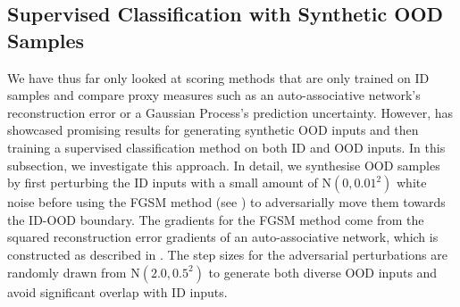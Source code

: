 \subsection{Supervised Classification with Synthetic OOD Samples} \label{txt:ood-scoring-classification}

We have thus far only looked at scoring methods that are only trained on ID samples and compare proxy measures such as an auto-associative network's reconstruction error or a Gaussian Process's prediction uncertainty. However,  has showcased promising results for generating synthetic OOD inputs and then training a supervised classification method on both ID and OOD inputs. In this subsection, we investigate this approach. In detail, we synthesise OOD samples by first perturbing the ID inputs with a small amount of $\text{N}(0, 0.01^2)$ white noise before using the FGSM method (see ) to adversarially move them towards the ID-OOD boundary. The gradients for the FGSM method come from the squared reconstruction error gradients of an auto-associative network, which is constructed as described in . The step sizes for the adversarial perturbations are randomly drawn from $\text{N}(2.0, 0.5^2)$ to generate both diverse OOD inputs and avoid significant overlap with ID inputs.

